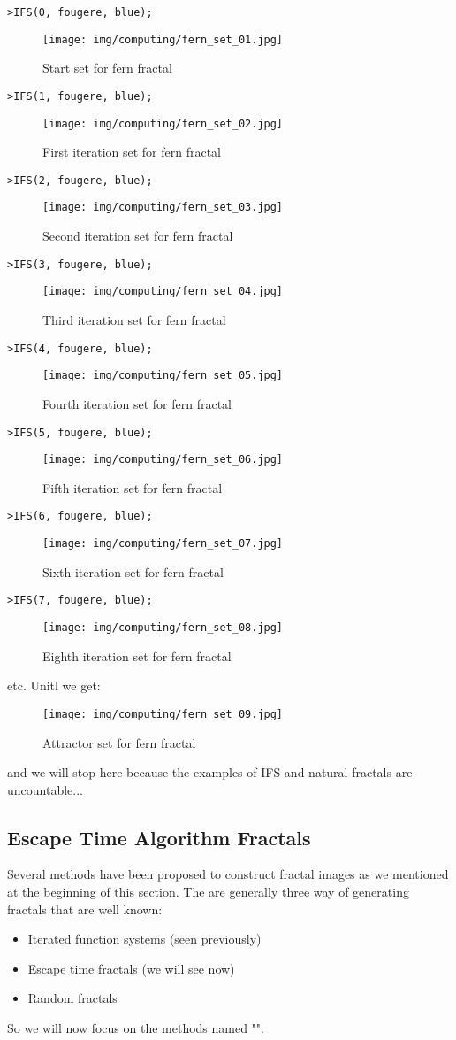 	\texttt{>IFS(0, fougere, blue);}
	\begin{figure}[H]
		\centering
		\texttt{[image: img/computing/fern\_set\_01.jpg]}
		\caption[]{Start set for fern fractal}
	\end{figure}
	\texttt{>IFS(1, fougere, blue);}
	\begin{figure}[H]
		\centering
		\texttt{[image: img/computing/fern\_set\_02.jpg]}
		\caption[]{First iteration set for fern fractal}
	\end{figure}
	\texttt{>IFS(2, fougere, blue);}
	\begin{figure}[H]
		\centering
		\texttt{[image: img/computing/fern\_set\_03.jpg]}
		\caption[]{Second iteration set for fern fractal}
	\end{figure}
	\texttt{>IFS(3, fougere, blue);}
	\begin{figure}[H]
		\centering
		\texttt{[image: img/computing/fern\_set\_04.jpg]}
		\caption[]{Third iteration set for fern fractal}
	\end{figure}
	\texttt{>IFS(4, fougere, blue);}
	\begin{figure}[H]
		\centering
		\texttt{[image: img/computing/fern\_set\_05.jpg]}
		\caption[]{Fourth iteration set for fern fractal}
	\end{figure}
	\texttt{>IFS(5, fougere, blue);}
	\begin{figure}[H]
		\centering
		\texttt{[image: img/computing/fern\_set\_06.jpg]}
		\caption[]{Fifth iteration set for fern fractal}
	\end{figure}
	\texttt{>IFS(6, fougere, blue);}
	\begin{figure}[H]
		\centering
		\texttt{[image: img/computing/fern\_set\_07.jpg]}
		\caption[]{Sixth iteration set for fern fractal}
	\end{figure}
	\texttt{>IFS(7, fougere, blue);}
	\begin{figure}[H]
		\centering
		\texttt{[image: img/computing/fern\_set\_08.jpg]}
		\caption[]{Eighth iteration set for fern fractal}
	\end{figure}
	etc. Unitl we get:
	\begin{figure}[H]
		\centering
		\texttt{[image: img/computing/fern\_set\_09.jpg]}
		\caption[]{Attractor set for fern fractal}
	\end{figure}
	and we will stop here because the examples of IFS and natural fractals are uncountable...
	
	\pagebreak
	\subsection{Escape Time Algorithm Fractals}
	Several methods have been proposed to construct fractal images as we mentioned at the beginning of this section. The are generally three way of generating fractals that are well known:
	\begin{itemize}
		\item Iterated function systems (seen previously)
		\item Escape time fractals (we will see now)
		\item Random fractals
	\end{itemize}
	So we will now focus on the methods named "".
	
